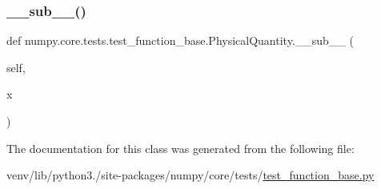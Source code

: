 \subsubsection{\texorpdfstring{\+\_\+\+\_\+sub\+\_\+\+\_\+()}{\_\_sub\_\_()}}
{\footnotesize\ttfamily def numpy.\+core.\+tests.\+test\+\_\+function\+\_\+base.\+Physical\+Quantity.\+\_\+\+\_\+sub\+\_\+\+\_\+ (\begin{DoxyParamCaption}\item[{}]{self,  }\item[{}]{x }\end{DoxyParamCaption})}



The documentation for this class was generated from the following file\+:\begin{DoxyCompactItemize}
\item 
venv/lib/python3./site-\/packages/numpy/core/tests/\hyperlink{core_2tests_2test__function__base_8py}{test\+\_\+function\+\_\+base.\+py}\end{DoxyCompactItemize}
